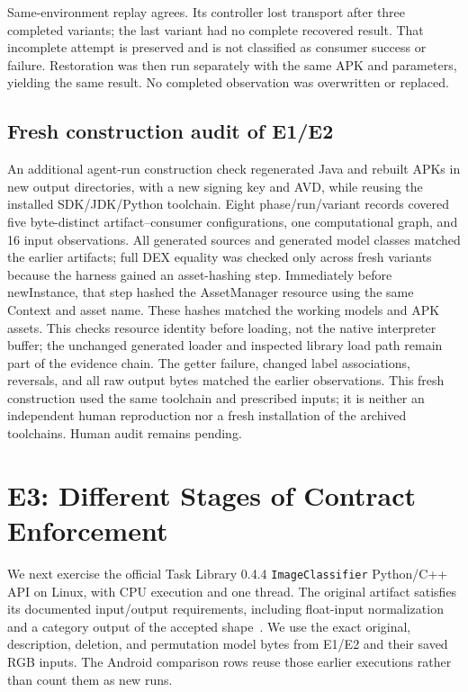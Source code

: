 \documentclass[10pt,twocolumn,letterpaper]{article}
\newcommand{\code}[1]{\texttt{#1}}
\begin{document}
Same-environment replay agrees. Its controller lost transport after three completed variants; the last variant had no complete recovered result. That incomplete attempt is preserved and is not classified as consumer success or failure. Restoration was then run separately with the same APK and parameters, yielding the same result. No completed observation was overwritten or replaced.

\subsection{Fresh construction audit of E1/E2}
\label{sec:rebuild}
An additional agent-run construction check regenerated Java and rebuilt APKs in new output directories, with a new signing key and AVD, while reusing the installed SDK/JDK/Python toolchain. Eight phase/run/variant records covered five byte-distinct artifact--consumer configurations, one computational graph, and 16 input observations. All generated sources and generated model classes matched the earlier artifacts; full DEX equality was checked only across fresh variants because the harness gained an asset-hashing step. Immediately before newInstance, that step hashed the AssetManager resource using the same Context and asset name. These hashes matched the working models and APK assets. This checks resource identity before loading, not the native interpreter buffer; the unchanged generated loader and inspected library load path remain part of the evidence chain. The getter failure, changed label associations, reversals, and all raw output bytes matched the earlier observations. This fresh construction used the same toolchain and prescribed inputs; it is neither an independent human reproduction nor a fresh installation of the archived toolchains. Human audit remains pending.

\section{E3: Different Stages of Contract Enforcement}
\label{sec:e3}
We next exercise the official Task Library 0.4.4 \code{ImageClassifier} Python/C++ API on Linux, with CPU execution and one thread. The original artifact satisfies its documented input/output requirements, including float-input normalization and a category output of the accepted shape~\cite{task-classifier}. We use the exact original, description, deletion, and permutation model bytes from E1/E2 and their saved RGB inputs. The Android comparison rows reuse those earlier executions rather than count them as new runs.
\end{document}
